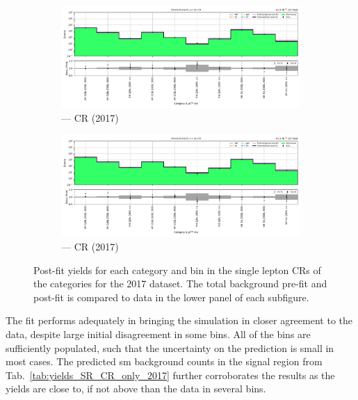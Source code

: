\begin{figure}[htbp]
    \centering
    \begin{subfigure}[b]{\textwidth}
        \includegraphics[width=\textwidth]{chapters/higgstoinv/figures/mountain_ranges/2017/VH/Wmunu_tree_fit_b-abs_values_VH_cats.pdf}
        \caption{\VH --- \singleMuCr \gls{CR} (2017)}
    \end{subfigure}
    \hfill
    \begin{subfigure}[b]{\textwidth}
        \includegraphics[width=\textwidth]{chapters/higgstoinv/figures/mountain_ranges/2017/VH/Wenu_tree_fit_b-abs_values_VH_cats.pdf}
        \caption{\VH --- \singleEleCr \gls{CR} (2017)}
    \end{subfigure}
    \caption[Post-fit yields for each category and \ptmiss bin in the single lepton control regions of the \VH categories for the 2017 dataset]{Post-fit yields for each category and \ptmiss bin in the single lepton \glspl{CR} of the \VH categories for the 2017 dataset. The total background pre-fit and post-fit is compared to data in the lower panel of each subfigure.}
    \label{fig:htoinv_mountain_range_2017_single_lep_VH}
\end{figure}

The fit performs adequately in bringing the simulation in closer agreement to the data, despite large initial disagreement in some bins. All of the bins are sufficiently populated, such that the uncertainty on the prediction is small in most cases. The predicted \acrshort{sm} background counts in the signal region from Tab.~\ref{tab:yields_SR_CR_only_2017} further corroborates the results as the yields are close to, if not above than the data in several bins.



